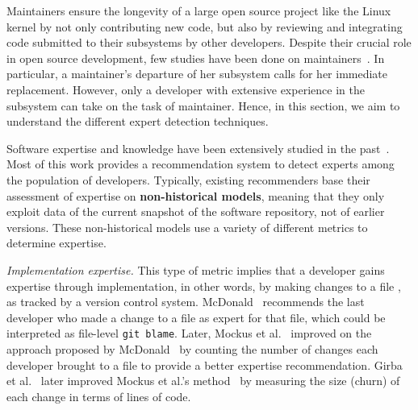 

Maintainers ensure the longevity of a large open source project like the Linux kernel by not only contributing new code, but also by reviewing and integrating code submitted to their subsystems by other developers. Despite their crucial role in open source development, %
few studies have been done on maintainers~\cite{Zhou-fse}. 
In particular, a maintainer's departure of her subsystem calls for her immediate replacement. However, only a developer with extensive experience in the subsystem can take on the task of maintainer. Hence, in this section, we aim to understand the different expert detection techniques. %

Software expertise and knowledge have been extensively studied in the past~\cite{Bhattacharya, mockus02, McDonald, Fritz-2007}. Most of this work %
provides a recommendation system to detect experts among the population of developers. %
Typically, existing %
recommenders %
base their assessment of expertise on \textbf{non-historical models}, meaning that they only exploit data of the current snapshot of the software repository, not of earlier versions. These non-historical models use a variety of different metrics to determine expertise.

\textit{Implementation expertise.} This type of metric implies that a developer gains expertise through implementation, in other words, by making changes to a file%
, %
as tracked by a version control system. McDonald~\cite{McDonald} recommends the last developer who made a change to a file as expert for that file, which could be interpreted as file-level \texttt{git blame}. Later, Mockus et al.~\cite{mockus02} improved on the approach proposed by McDonald~\cite{McDonald} by counting the number of changes each developer brought to a file to provide a better expertise recommendation. Girba et al.~\cite{1572315} later improved Mockus et al.'s method~\cite{mockus02} by measuring the size (churn) of each change in terms of lines of code.  %

